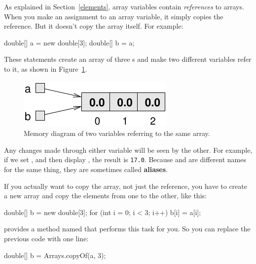
As explained in Section~\ref{elements}, array variables contain {\em references} to arrays.
When you make an assignment to an array variable, it simply copies the reference.
But it doesn't copy the array itself.
For example:

\begin{code}
double[] a = new double[3];
double[] b = a;
\end{code}

These statements create an array of three s and make two different variables refer to it, as shown in Figure~\ref{fig.array3}.


\begin{figure}[!ht]
\begin{center}
\includegraphics{figs/array3.pdf}
\caption{Memory diagram of two variables referring to the same array.}
\label{fig.array3}
\end{center}
\end{figure}


Any changes made through either variable will be seen by the other.
For example, if we set , and then display , the result is {\tt 17.0}.
Because  and  are different names for the same thing, they are sometimes called {\bf aliases}.

If you actually want to copy the array, not just the reference, you have to create a new array and copy the elements from one to the other, like this:

\begin{code}
double[] b = new double[3];
for (int i = 0; i < 3; i++) {
    b[i] = a[i];
}
\end{code}


 provides a method named  that performs this task for you.
So you can replace the previous code with one line:

\begin{code}
double[] b = Arrays.copyOf(a, 3);
\end{code}

